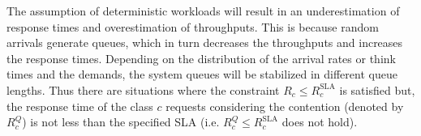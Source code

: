   The assumption of deterministic workloads will result in an underestimation of response times and overestimation of throughputs. This is because random arrivals generate queues, which in turn decreases the throughputs and increases the response times.   Depending on the distribution of the arrival rates or think times and the demands, the system queues will be stabilized in different queue lengths. 
  Thus there are situations where the constraint $R_c\le R_{c}^\text{SLA}$ is satisfied but, the response time of the class $c$ requests considering the contention (denoted by $R^Q_c$) is not less than the specified SLA (i.e. $R^Q_c \le R_{c}^\text{SLA}$ does not hold).
